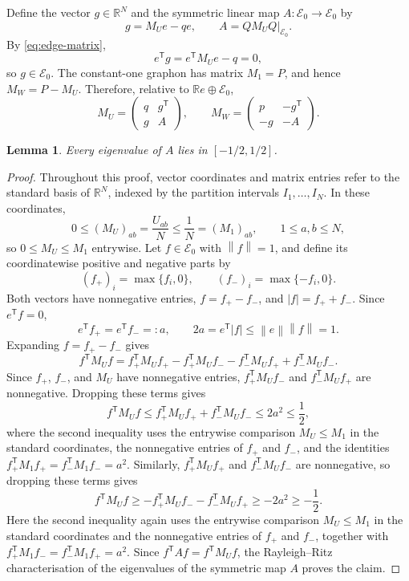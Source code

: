 \documentclass[11pt]{article}
\newtheorem{lemma}[theorem]{Lemma}
\theoremstyle{remark}
\numberwithin{equation}{section}
\newcommand{\R}{\mathbb R}
\newcommand{\norm}[1]{\left\lVert #1\right\rVert}
\begin{document}
Define the vector $g\in\R^N$ and the symmetric linear map
$A\colon\mathcal E_0\to\mathcal E_0$ by
\begin{equation*}
  g=M_Ue-qe,
  \qquad
  A=QM_UQ\big|_{\mathcal E_0}.
\end{equation*}
By \eqref{eq:edge-matrix},
\[
  e^{\mathsf T}g=e^{\mathsf T}M_Ue-q=0,
\]
so $g\in\mathcal E_0$.
The constant-one graphon has matrix $M_1=P$, and hence $M_W=P-M_U$.
Therefore, relative to $\R e\oplus\mathcal E_0$,
\begin{equation}\label{eq:block-UW}
  M_U=
  \begin{pmatrix}
    q&g^{\mathsf T}\\
    g&A
  \end{pmatrix},
  \qquad
  M_W=
  \begin{pmatrix}
    p&-g^{\mathsf T}\\
    -g&-A
  \end{pmatrix}.
\end{equation}

\begin{lemma}\label{lem:half-norm}
  Every eigenvalue of $A$ lies in $[-1/2,1/2]$.
\end{lemma}

\begin{proof}
  Throughout this proof, vector coordinates and matrix entries refer to the standard basis of $\R^N$, indexed by the partition intervals $I_1,\ldots,I_N$.
  In these coordinates,
  \[
    0\le (M_U)_{ab}=\frac{U_{ab}}{N}\le\frac1N=(M_1)_{ab},
    \qquad 1\le a,b\le N,
  \]
  so $0\le M_U\le M_1$ entrywise.
  Let $f\in\mathcal E_0$ with $\norm f=1$, and define its coordinatewise
  positive and negative parts by
  \[
    (f_+)_i=\max\{f_i,0\},
    \qquad
    (f_-)_i=\max\{-f_i,0\}.
  \]
  Both vectors have nonnegative entries, $f=f_+-f_-$, and $|f|=f_++f_-$.
  Since $e^{\mathsf T}f=0$,
  \[
    e^{\mathsf T}f_+=e^{\mathsf T}f_-=:a,
    \qquad
    2a=e^{\mathsf T}|f|\le\norm e\norm f=1.
  \]
  Expanding $f=f_+-f_-$ gives
  \[
    f^{\mathsf T}M_Uf
    =f_+^{\mathsf T}M_Uf_+
     -f_+^{\mathsf T}M_Uf_-
     -f_-^{\mathsf T}M_Uf_+
     +f_-^{\mathsf T}M_Uf_-.
  \]
  Since $f_+$, $f_-$, and $M_U$ have nonnegative entries,
  $f_+^{\mathsf T}M_Uf_-$ and $f_-^{\mathsf T}M_Uf_+$ are nonnegative.
  Dropping these terms gives
  \[
    f^{\mathsf T}M_Uf
    \le f_+^{\mathsf T}M_Uf_++f_-^{\mathsf T}M_Uf_-
      \le2a^2\le\frac12,
  \]
  where the second inequality uses the entrywise comparison $M_U\le M_1$
  in the standard coordinates, the nonnegative entries of $f_+$ and $f_-$,
  and the identities $f_+^{\mathsf T}M_1f_+=f_-^{\mathsf T}M_1f_-=a^2$.  Similarly,
  $f_+^{\mathsf T}M_Uf_+$ and $f_-^{\mathsf T}M_Uf_-$ are nonnegative,
  so dropping these terms gives
  \[
    f^{\mathsf T}M_Uf
    \ge-f_+^{\mathsf T}M_Uf_- - f_-^{\mathsf T}M_Uf_+
      \ge-2a^2\ge-\frac12.
  \]
  Here the second inequality again uses the entrywise comparison $M_U\le M_1$
  in the standard coordinates and the nonnegative entries of $f_+$ and $f_-$,
  together with $f_+^{\mathsf T}M_1f_-=f_-^{\mathsf T}M_1f_+=a^2$.
  Since $f^{\mathsf T}Af=f^{\mathsf T}M_Uf$, the Rayleigh--Ritz
  characterisation of the eigenvalues of the symmetric map $A$ proves the
  claim.
\end{proof}
\end{document}
